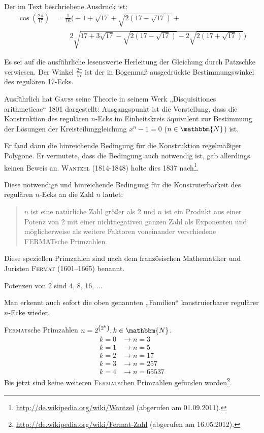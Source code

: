 \documentclass[11pt]{article}
\newcommand{\br}[1]{\ensuremath{\left(#1\right)}}
\newcommand{\N}{\mathbbm{N}}
\begin{document}
Der im Text beschriebene Ausdruck ist: 
\begin{align*}
  \cos\br{\frac{2\pi}{17}}&= \frac{1}{16}
  \Bigg(-1+\sqrt{17}+\sqrt{{2\br{17-\sqrt{17}}}}+\\ &\qquad
  2\sqrt{17+3\sqrt{17}-\sqrt{2\br{17-\sqrt{17}}}-2\sqrt{2\br{17+\sqrt{17}}}}
  \Bigg) \tag{1}
\end{align*}

Es sei auf die ausführliche lesenswerte Herleitung der Gleichung durch
Patzschke \cite{Patzschke2002} verwiesen. Der Winkel $\frac{2\pi}{17}$ ist der
in Bogenmaß ausgedrückte Bestimmungswinkel des regulären 17-Ecks.

Ausführlich hat \textsc{Gauss} seine Theorie in seinem Werk „Disquisitiones
arithmeticae“ 1801 dargestellt: Ausgangspunkt ist die Vorstellung, dass die
Konstruktion des regulären $n$-Ecks im Einheitskreis äquivalent zur Bestimmung
der Lösungen der Kreisteilunggleichung $x^n - 1 = 0$ ($n\in\N$) ist.

Er fand dann die hinreichende Bedingung für die Konstruktion regelmäßiger
Polygone. Er vermutete, dass die Bedingung auch notwendig ist, gab allerdings
keinen Beweis an. \textsc{Wantzel} (1814-1848) holte dies 1837
nach\footnote{\url{http://de.wikipedia.org/wiki/Wantzel} (abgerufen am
  01.09.2011).}.

Diese notwendige und hinreichende Bedingung für die Konstruierbarkeit des
regulären $n$-Ecks an die Zahl $n$ lautet:
\begin{quote}
  $n$ ist eine natürliche Zahl größer als 2 und $n$ ist ein Produkt aus einer
  Potenz von 2 mit einer nichtnegativen ganzen Zahl als Exponenten und
  möglicherweise als weitere Faktoren voneinander verschiedene FERMATsche
  Primzahlen.
\end{quote}
Diese speziellen Primzahlen sind nach dem französischen Mathematiker und
Juristen \textsc{Fermat} (1601--1665) benannt.

Potenzen von 2 sind 4, 8, 16, ...

Man erkennt auch sofort die oben genannten „Familien“ konstruierbarer
regulärer $n$-Ecke wieder.

\textsc{Fermat}sche Primzahlen $n =2^{\br{2^k}}, k\in\N$.
\begin{align*}
  k = 0 &\rightarrow{} n = 3\\
  k = 1 &\rightarrow{} n = 5\\
  k = 2 &\rightarrow{} n = 17\\
  k = 3 &\rightarrow{} n = 257\\
  k = 4 &\rightarrow{} n = 65537
\end{align*}
Bis jetzt sind keine weiteren \textsc{Fermat}schen Primzahlen gefunden
worden\footnote{\url{http://de.wikipedia.org/wiki/Fermat-Zahl} (abgerufen am
  16.05.2012).}.
\end{document}
